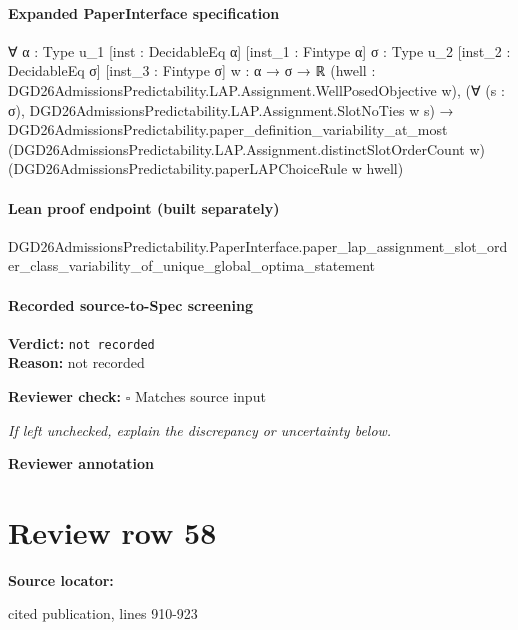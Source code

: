 \documentclass[10pt]{article}
\newcommand{\reviewerbox}{%
  \par\noindent\fbox{\parbox{0.96\linewidth}{\rule{0pt}{0.38in}}}\par
}
\newcommand{\reviewmatch}[1]{%
  \par\noindent\textbf{Reviewer check:} $\square$\; #1\par
  \noindent\emph{If left unchecked, explain the discrepancy or uncertainty below.}\par
}
\begin{document}
\paragraph{Expanded PaperInterface specification}
\begin{ReviewVerbatim}
∀ {α : Type u_1} [inst : DecidableEq α] [inst_1 : Fintype α] {σ : Type u_2} [inst_2 : DecidableEq σ]
  [inst_3 : Fintype σ] {w : α → σ → ℝ} (hwell : DGD26AdmissionsPredictability.LAP.Assignment.WellPosedObjective w),
  (∀ (s : σ), DGD26AdmissionsPredictability.LAP.Assignment.SlotNoTies w s) →
    DGD26AdmissionsPredictability.paper_definition_variability_at_most
      (DGD26AdmissionsPredictability.LAP.Assignment.distinctSlotOrderCount w)
      (DGD26AdmissionsPredictability.paperLAPChoiceRule w hwell)
\end{ReviewVerbatim}

\paragraph{Lean proof endpoint (built separately)}\begin{ReviewVerbatim}
DGD26AdmissionsPredictability.PaperInterface.paper_lap_assignment_slot_order_class_variability_of_unique_global_optima_statement
\end{ReviewVerbatim}

\paragraph{Recorded source-to-Spec screening}
\textbf{Verdict:} \texttt{not recorded}
\\
\textbf{Reason:} not recorded
\reviewmatch{Matches source input}
\noindent\textbf{Reviewer annotation}\par
\reviewerbox
\clearpage
\hypertarget{source-claim-a9c5e5d5c616ab58}{}
\section*{Review row 58}
\textbf{Source locator:} {\footnotesize\raggedright cited publication, lines 910-\allowbreak{}923\par}
\end{document}
